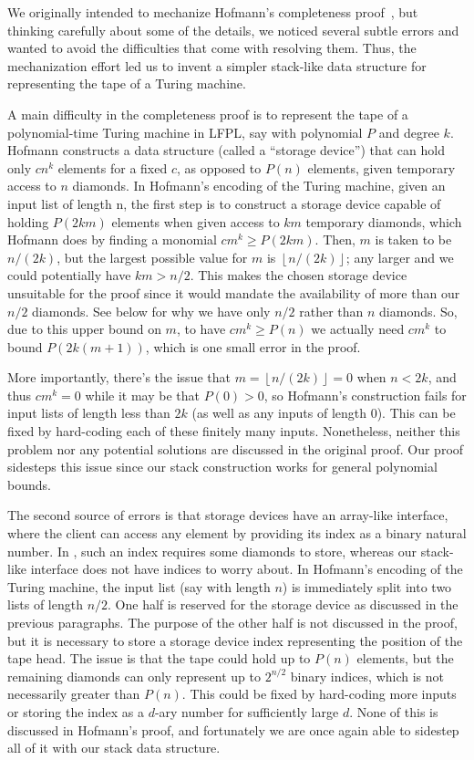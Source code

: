 We originally intended to mechanize Hofmann’s completeness proof~\cite{hofmannStrengthNonsizeIncreasing2002}, but thinking carefully about some of the details, we noticed several subtle errors and wanted to avoid the difficulties that come with resolving them. Thus, the mechanization effort led us to invent a simpler stack-like data structure for representing the tape of a Turing machine.

A main difficulty in the completeness proof is to represent the tape of a polynomial-time Turing machine in LFPL, say with polynomial $P$ and degree $k$. Hofmann constructs a data structure (called a “storage device”) that can hold only $cn^k$ elements for a fixed $c$, as opposed to $P(n)$ elements, given temporary access to $n$ diamonds. In Hofmann’s encoding of the Turing machine, given an input list of length n, the first step is to construct a storage device capable of holding $P(2km)$ elements when given access to $km$ temporary diamonds, which Hofmann does by finding a monomial $cm^k \ge P(2km)$. Then, $m$ is taken to be $n/(2k)$, but the largest possible value for $m$ is $\left\lfloor n/(2k) \right\rfloor$; any larger and we could potentially have $km > n/2$. This makes the chosen storage device unsuitable for the proof since it would mandate the availability of more than our $n/2$ diamonds. See below for why we have only $n/2$ rather than $n$ diamonds. So, due to this upper bound on $m$, to have $cm^k \ge P(n)$ we actually need $cm^k$ to bound $P(2k(m + 1))$, which is one small error in the proof.

More importantly, there’s the issue that $m = \left\lfloor n/(2k) \right\rfloor = 0$ when $n < 2k$, and thus $cm^k = 0$ while it may be that $P(0) > 0$, so Hofmann’s construction fails for input lists of length less than $2k$ (as well as any inputs of length $0$). This can be fixed by hard-coding each of these finitely many inputs. Nonetheless, neither this problem nor any potential solutions are discussed in the original proof. Our proof sidesteps this issue since our stack construction works for general polynomial bounds.

The second source of errors is that storage devices have an array-like interface, where the client can access any element by providing its index as a binary natural number. In \lfpl, such an index requires some diamonds to store, whereas our stack-like interface does not have indices to worry about. In Hofmann’s encoding of the Turing machine, the input list (say with length $n$) is immediately split into two lists of length $n/2$. One half is reserved for the storage device as discussed in the previous paragraphs. The purpose of the other half is not discussed in the proof, but it is necessary to store a storage device index representing the position of the tape head. The issue is that the tape could hold up to $P(n)$ elements, but the remaining diamonds can only represent up to $2^{n/2}$ binary indices, which is not necessarily greater than $P(n)$. This could be fixed by hard-coding more inputs or storing the index as a $d$-ary number for sufficiently large $d$. None of this is discussed in Hofmann’s proof, and fortunately we are once again able to sidestep all of it with our stack data structure.
